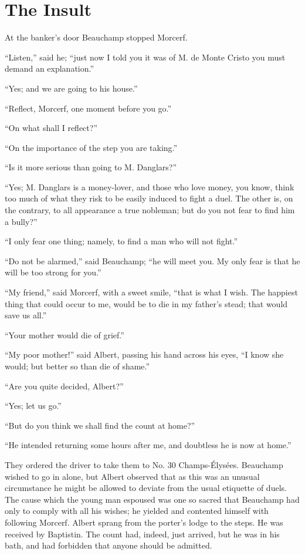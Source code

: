 \chapter{The Insult}

At the banker’s door Beauchamp stopped Morcerf.

“Listen,” said he; “just now I told you it was of M. de Monte Cristo
you must demand an explanation.”

“Yes; and we are going to his house.”

“Reflect, Morcerf, one moment before you go.”

“On what shall I reflect?”

“On the importance of the step you are taking.”

“Is it more serious than going to M. Danglars?”

“Yes; M. Danglars is a money-lover, and those who love money, you know,
think too much of what they risk to be easily induced to fight a duel.
The other is, on the contrary, to all appearance a true nobleman; but
do you not fear to find him a bully?”

“I only fear one thing; namely, to find a man who will not fight.”

“Do not be alarmed,” said Beauchamp; “he will meet you. My only fear is
that he will be too strong for you.”

“My friend,” said Morcerf, with a sweet smile, “that is what I wish.
The happiest thing that could occur to me, would be to die in my
father’s stead; that would save us all.”

“Your mother would die of grief.”

“My poor mother!” said Albert, passing his hand across his eyes, “I
know she would; but better so than die of shame.”

“Are you quite decided, Albert?”

“Yes; let us go.”

“But do you think we shall find the count at home?”

“He intended returning some hours after me, and doubtless he is now at
home.”

They ordered the driver to take them to No. 30 Champs-Élysées.
Beauchamp wished to go in alone, but Albert observed that as this was
an unusual circumstance he might be allowed to deviate from the usual
etiquette of duels. The cause which the young man espoused was one so
sacred that Beauchamp had only to comply with all his wishes; he
yielded and contented himself with following Morcerf. Albert sprang
from the porter’s lodge to the steps. He was received by Baptistin. The
count had, indeed, just arrived, but he was in his bath, and had
forbidden that anyone should be admitted.

